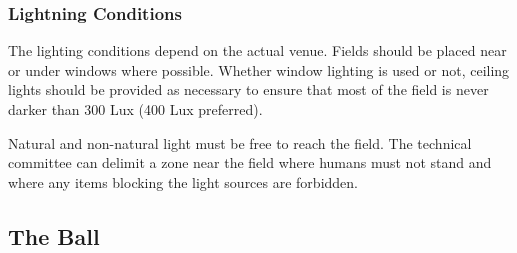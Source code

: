 \subsubsection{Lightning Conditions}
\label{sec:lightConditions}

The lighting conditions depend on the actual venue.
Fields should be placed near or under windows where possible.
Whether window lighting is used or not, ceiling lights should be provided as necessary to ensure that most of the field is never darker than 300 Lux (400 Lux preferred).

Natural and non-natural light must be free to reach the field. The technical committee can delimit a zone near the field where humans must not stand and where any items blocking the light sources are forbidden. 

\subsection{The Ball}
\label{sec:ball}
